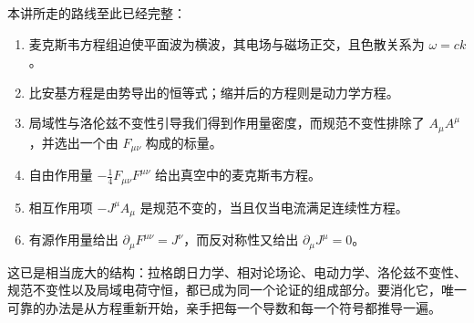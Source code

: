 本讲所走的路线至此已经完整：
\begin{enumerate}
\item 麦克斯韦方程组迫使平面波为横波，其电场与磁场正交，且色散关系为
      \(\omega=ck\)。
\item 比安基方程是由势导出的恒等式；缩并后的方程则是动力学方程。
\item 局域性与洛伦兹不变性引导我们得到作用量密度，而规范不变性排除了 \(A_\mu A^\mu\)，并选出一个由 \(F_{\mu\nu}\) 构成的标量。
\item 自由作用量
      \(-\tfrac14F_{\mu\nu}F^{\mu\nu}\) 给出真空中的麦克斯韦方程。
\item 相互作用项 \(-J^\mu A_\mu\) 是规范不变的，当且仅当电流满足连续性方程。
\item 有源作用量给出
      \(\partial_\mu F^{\mu\nu}=J^\nu\)，而反对称性又给出
      \(\partial_\mu J^\mu=0\)。
\end{enumerate}

这已是相当庞大的结构：拉格朗日力学、相对论场论、电动力学、洛伦兹不变性、规范不变性以及局域电荷守恒，都已成为同一个论证的组成部分。要消化它，唯一可靠的办法是从方程重新开始，亲手把每一个导数和每一个符号都推导一遍。

